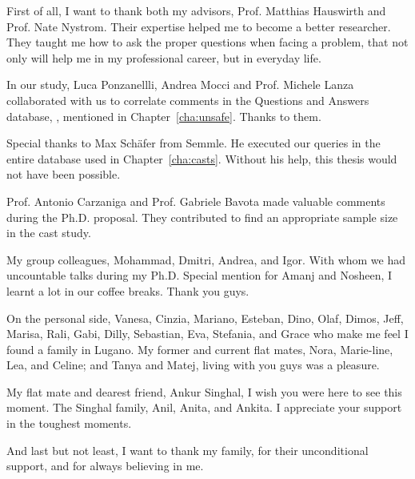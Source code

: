 \begin{acknowledgements}
First of all, I want to thank both my advisors,
Prof. Matthias Hauswirth and Prof. Nate Nystrom.
Their expertise helped me to become a better researcher.
They taught me how to ask the proper questions when facing a problem,
that not only will help me in my professional career,
but in everyday life.

In our \unsafe{} study,
Luca Ponzanellli, Andrea Mocci and Prof. Michele Lanza
collaborated with us to correlate \unsafe{} 
comments in the Questions and Answers database, \stackoverflow{}, mentioned in Chapter~\ref{cha:unsafe}.
Thanks to them.

Special thanks to Max Sch\"afer from Semmle.
He executed our \ql{} queries in the entire \lgtm{} database used in Chapter~\ref{cha:casts}.
Without his help, this thesis would not have been possible.

Prof. Antonio Carzaniga and Prof. Gabriele Bavota made valuable comments during the Ph.D. proposal.
They contributed to find an appropriate sample size in the cast study.

My group colleagues, Mohammad, Dmitri, Andrea, and Igor.
With whom we had uncountable talks during my Ph.D.
Special mention for Amanj and Nosheen,
I learnt a lot in our coffee breaks.
Thank you guys.

On the personal side,
Vanesa, Cinzia, Mariano, Esteban, Dino, Olaf, Dimos, Jeff, Marisa, Rali, Gabi, Dilly, Sebastian, Eva, Stefania, and Grace 
who make me feel I found a family in Lugano.
My former and current flat mates, Nora, Marie-line, Lea, and Celine;
and Tanya and Matej, living with you guys was a pleasure.

My flat mate and dearest friend, Ankur Singhal,
I wish you were here to see this moment.
The Singhal family, Anil, Anita, and Ankita.
I appreciate your support in the toughest moments.

And last but not least,
I want to thank my family, for their unconditional support,
and for always believing in me.

\end{acknowledgements}
